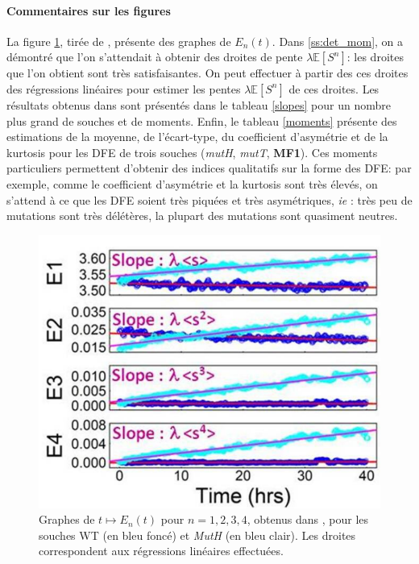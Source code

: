 \documentclass[12pt]{article}
\newcommand{\cro}[1]{\left[#1\right]}
\newcommand{\ie}{\emph{ie} }
\newcommand{\Esp}[1]{\mathbb{E}\cro{#1}}
\begin{document}
\paragraph{Commentaires sur les figures} La figure \ref{lines}, tirée de \cite{rob}, présente des graphes de $E_n(t)$. Dans \ref{ss:det_mom}, on a démontré que l'on s'attendait à obtenir des droites de pente $\lambda\Esp{S^n}$: les droites que l'on obtient sont très satisfaisantes. On peut effectuer à partir des ces droites des régressions linéaires pour estimer  les pentes $\lambda\Esp{S^n}$ de ces droites. Les résultats obtenus dans \cite{rob} sont présentés dans le tableau \ref{slopes} pour un nombre plus grand de souches et de moments. Enfin, le tableau \ref{moments} présente des estimations de la moyenne, de l'écart-type, du coefficient d'asymétrie et de la kurtosis pour les DFE de trois souches (\emph{mutH}, \emph{mutT}, \textbf{MF1}). Ces moments particuliers permettent d'obtenir des indices qualitatifs sur la forme des DFE: par exemple, comme le coefficient d'asymétrie et la kurtosis sont très élevés, on s'attend à ce que les DFE soient très piquées et très asymétriques, \ie: très peu de mutations sont très délétères, la plupart des mutations sont quasiment neutres.


\begin{figure}[h]
  \begin{center}
    \includegraphics[scale=0.3]{img/supmat_lines.png}
  \end{center}
  \caption{\label{lines}Graphes de $t\mapsto E_n(t)$ pour $n=1,2,3,4$, obtenus dans \cite{rob}, pour les souches WT (en bleu foncé) et \emph{MutH} (en bleu clair). Les droites correspondent aux régressions linéaires effectuées.}
\end{figure}
\end{document}
